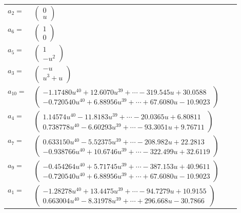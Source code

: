 \documentclass[1p]{elsarticle_modified}
\theoremstyle{definition}
\begin{document}
\begin{tabular}{m{7pt} m{180pt} m{7pt} m{180pt} }
\flushright $a_{2}=$&$\begin{pmatrix}0\\u\end{pmatrix}$ \\
\flushright $a_{6}=$&$\begin{pmatrix}1\\0\end{pmatrix}$ \\
\flushright $a_{5}=$&$\begin{pmatrix}1\\- u^2\end{pmatrix}$ \\
\flushright $a_{3}=$&$\begin{pmatrix}- u\\u^3+u\end{pmatrix}$ \\
\flushright $a_{10}=$&$\begin{pmatrix}-1.17480 u^{40}+12.6070 u^{39}+\cdots-319.545 u+30.0588\\-0.720540 u^{40}+6.88956 u^{39}+\cdots+67.6080 u-10.9023\end{pmatrix}$ \\
\flushright $a_{4}=$&$\begin{pmatrix}1.14574 u^{40}-11.8183 u^{39}+\cdots-20.0365 u+6.80811\\0.738778 u^{40}-6.60293 u^{39}+\cdots-93.3051 u+9.76711\end{pmatrix}$ \\
\flushright $a_{7}=$&$\begin{pmatrix}0.633150 u^{40}-5.52375 u^{39}+\cdots-208.982 u+22.2813\\-0.938766 u^{40}+10.6746 u^{39}+\cdots-322.499 u+32.6119\end{pmatrix}$ \\
\flushright $a_{9}=$&$\begin{pmatrix}-0.454264 u^{40}+5.71745 u^{39}+\cdots-387.153 u+40.9611\\-0.720540 u^{40}+6.88956 u^{39}+\cdots+67.6080 u-10.9023\end{pmatrix}$ \\
\flushright $a_{1}=$&$\begin{pmatrix}-1.28278 u^{40}+13.4475 u^{39}+\cdots-94.7279 u+10.9155\\0.663004 u^{40}-8.31978 u^{39}+\cdots+296.668 u-30.7866\end{pmatrix}$ \\

\end{tabular}
\end{document}
